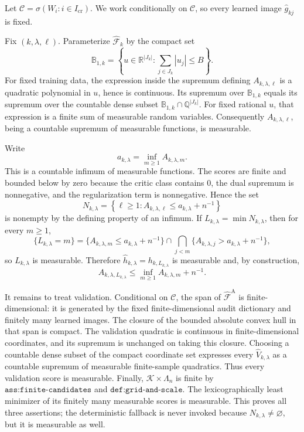 Let \(\mathscr C=\sigma(W_i:i\in I_{\mathrm{cr}})\). We work conditionally on \(\mathscr C\), so every learned image \(\widehat g_{kj}\) is fixed.

Fix \((k,\lambda,\ell)\). Parameterize \(\widehat{\mathcal F}_k\) by the compact set
\[
 \mathbb B_{1,k}=\left\{u\in\mathbb R^{|J_k|}:\sum_{j\in J_k}|u_j|\le B\right\}.
\]
For fixed training data, the expression inside the supremum defining \(A_{k,\lambda,\ell}\) is a quadratic polynomial in \(u\), hence is continuous. Its supremum over \(\mathbb B_{1,k}\) equals its supremum over the countable dense subset \(\mathbb B_{1,k}\cap\mathbb Q^{|J_k|}\). For fixed rational \(u\), that expression is a finite sum of measurable random variables. Consequently \(A_{k,\lambda,\ell}\), being a countable supremum of measurable functions, is measurable.

Write
\[
 a_{k,\lambda}=\inf_{m\ge1}A_{k,\lambda,m}.
\]
This is a countable infimum of measurable functions. The scores are finite and bounded below by zero because the critic class contains \(0\), the dual supremum is nonnegative, and the regularization term is nonnegative. Hence the set
\[
 N_{k,\lambda}=\left\{\ell\ge1:A_{k,\lambda,\ell}\le a_{k,\lambda}+n^{-1}\right\}
\]
is nonempty by the defining property of an infimum. If \(L_{k,\lambda}=\min N_{k,\lambda}\), then for every \(m\ge1\),
\[
 \{L_{k,\lambda}=m\}
 =\{A_{k,\lambda,m}\le a_{k,\lambda}+n^{-1}\}
  \cap\bigcap_{j<m}\{A_{k,\lambda,j}>a_{k,\lambda}+n^{-1}\},
\]
so \(L_{k,\lambda}\) is measurable. Therefore \(\widehat h_{k,\lambda}=h_{k,L_{k,\lambda}}\) is measurable and, by construction,
\[
 A_{k,\lambda,L_{k,\lambda}}
 \le \inf_{m\ge1}A_{k,\lambda,m}+n^{-1}.
\]

It remains to treat validation. Conditional on \(\mathscr C\), the span of \(\widehat{\mathcal F}^{\mathrm A}\) is finite-dimensional: it is generated by the fixed finite-dimensional audit dictionary and finitely many learned images. The closure of the bounded absolute convex hull in that span is compact. The validation quadratic is continuous in finite-dimensional coordinates, and its supremum is unchanged on taking this closure. Choosing a countable dense subset of the compact coordinate set expresses every \(\widehat V_{k,\lambda}\) as a countable supremum of measurable finite-sample quadratics. Thus every validation score is measurable. Finally, \(\mathcal K\times\Lambda_n\) is finite by \(\texttt{ass:finite-candidates}\) and \(\texttt{def:grid-and-scale}\). The lexicographically least minimizer of its finitely many measurable scores is measurable. This proves all three assertions; the deterministic fallback is never invoked because \(N_{k,\lambda}\ne\varnothing\), but it is measurable as well.